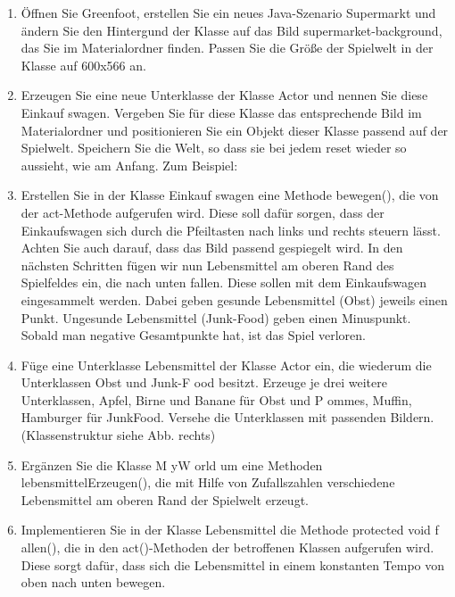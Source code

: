 \documentclass{bschlangaul-theorie}
\begin{document}
\begin{enumerate}


\item Öffnen Sie Greenfoot, erstellen Sie ein neues Java-Szenario
Supermarkt und ändern Sie den Hintergund der Klasse  auf
das Bild supermarket-background, das Sie im Materialordner finden.
Passen Sie die Größe der Spielwelt in der Klasse  auf
600x566 an.


\item Erzeugen Sie eine neue Unterklasse der Klasse Actor und nennen Sie
diese Einkauf swagen. Vergeben Sie für diese Klasse das entsprechende
Bild im Materialordner und positionieren Sie ein Objekt dieser Klasse
passend auf der Spielwelt. Speichern Sie die Welt, so dass sie bei jedem
reset wieder so aussieht, wie am Anfang. Zum Beispiel:


\item Erstellen Sie in der Klasse Einkauf swagen eine Methode bewegen(),
die von der act-Methode aufgerufen wird. Diese soll dafür sorgen, dass
der Einkaufswagen sich durch die Pfeiltasten nach links und rechts
steuern lässt. Achten Sie auch darauf, dass das Bild passend gespiegelt
wird. In den nächsten Schritten fügen wir nun Lebensmittel am oberen
Rand des Spielfeldes ein, die nach unten fallen. Diese sollen mit dem
Einkaufswagen eingesammelt werden. Dabei geben gesunde Lebensmittel
(Obst) jeweils einen Punkt. Ungesunde Lebensmittel (Junk-Food) geben
einen Minuspunkt. Sobald man negative Gesamtpunkte hat, ist das Spiel
verloren.


\item Füge eine Unterklasse Lebensmittel der Klasse Actor ein, die
wiederum die Unterklassen Obst und Junk-F ood besitzt. Erzeuge je drei
weitere Unterklassen, \zB Apfel, Birne und Banane für Obst und P
ommes, Muffin, Hamburger für JunkFood. Versehe die Unterklassen mit
passenden Bildern. (Klassenstruktur siehe Abb. rechts)


\item Ergänzen Sie die Klasse M yW orld um eine Methoden
lebensmittelErzeugen(), die mit Hilfe von Zufallszahlen verschiedene
Lebensmittel am oberen Rand der Spielwelt erzeugt.


\item Implementieren Sie in der Klasse Lebensmittel die Methode
protected void f allen(), die in den act()-Methoden der betroffenen
Klassen aufgerufen wird. Diese sorgt dafür, dass sich die Lebensmittel
in einem konstanten Tempo von oben nach unten bewegen.


\end{enumerate}
\end{document}
